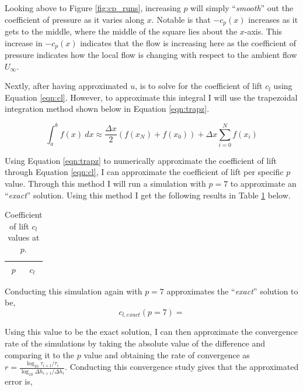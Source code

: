 Looking above to Figure \ref{fig:cp_runs}, increasing $p$ will simply ``\textit{smooth}'' out the coefficient of pressure as it varies along $x$. Notable is that $-c_p(x)$ increases as it gets to the middle, where the middle of the square lies about the $x$-axis. This increase in $-c_p(x)$ indicates that the flow is increasing here as the coefficient of pressure indicates how the local flow is changing with respect to the ambient flow $U_\infty$.

\medskip
Nextly, after having approximated $u$, is to solve for the coefficient of lift $c_l$ using Equation \ref{eqn:cl}. However, to approximate this integral I will use the trapezoidal integration method shown below in Equation \ref{eqn:trapz}.

\begin{equation}
    \int_a^bf(x)\ dx \approx \frac{\Delta x}{2}\left(f(x_N) + f(x_0)\right) + \Delta x\sum_{i=0}^N f(x_i)
    \label{eqn:trapz}
\end{equation}

\pagebreak
Using Equation \ref{eqn:trapz} to numerically approximate the coefficient of lift through Equation \ref{eqn:cl}, I can approximate the coefficient of lift per specific $p$ value. Through this method I will run a simulation with $p=7$ to approximate an ``\textit{exact}'' solution. Using this method I get the following results in Table \ref{tab:cl_vals} below.

\begin{table}[h]
    \centering
    \caption{Coefficient of lift $c_l$ values at $p$.}
    \label{tab:cl_vals}
    \begin{tabular}{c | c}
        $p$ & $c_l$\\
        \hline\hline
        
    \end{tabular}
\end{table}

Conducting this simulation again with $p=7$ approximates the ``\textit{exact}'' solution to be,
\begin{equation*}
    \boxed{c_{l,exact}(p=7) = }
\end{equation*}

Using this value to be the exact solution, I can then approximate the convergence rate of the simulations by taking the absolute value of the difference and comparing it to the $p$ value and obtaining the rate of convergence as $r = \frac{\log_{10}{\tau_{i+1}/\tau_i}}{\log_{10}{\Delta h_{i+1}/\Delta h_i}}$. Conducting this convergence study gives that the approximated error is,

